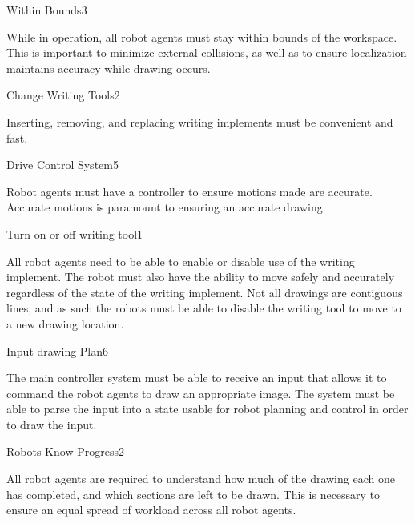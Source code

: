 \begin{functional_requirement}{Within Bounds}{3}
\item While in operation, all robot agents must stay within bounds of the workspace. This is important to minimize external collisions, as well as to ensure localization maintains accuracy while drawing occurs.
\end{functional_requirement}

\begin{functional_requirement}{Change Writing Tools}{2}
\item Inserting, removing, and replacing writing implements must be convenient and fast. 
\end{functional_requirement}

\begin{functional_requirement}{Drive Control System}{5}
\item Robot agents must have a controller to ensure motions made are accurate. Accurate motions is paramount to ensuring an accurate drawing.
\end{functional_requirement}

\begin{functional_requirement}{Turn on or off writing tool}{1}
\item All robot agents need to be able to enable or disable use of the writing implement. The robot must also have the ability to move safely and accurately regardless of the state of the writing implement. Not all drawings are contiguous lines, and as such the robots must be able to disable the writing tool to move to a new drawing location.
\end{functional_requirement}

\begin{functional_requirement}{Input drawing Plan}{6}
\item The main controller system must be able to receive an input that allows it to command the robot agents to draw an appropriate image. The system must be able to parse the input into a state usable for robot planning and control in order to draw the input.
\end{functional_requirement}

\begin{functional_requirement}{Robots Know Progress}{2}
\item All robot agents are required to understand how much of the drawing each one has completed, and which sections are left to be drawn. This is necessary to ensure an equal spread of workload across all robot agents.
\end{functional_requirement}


